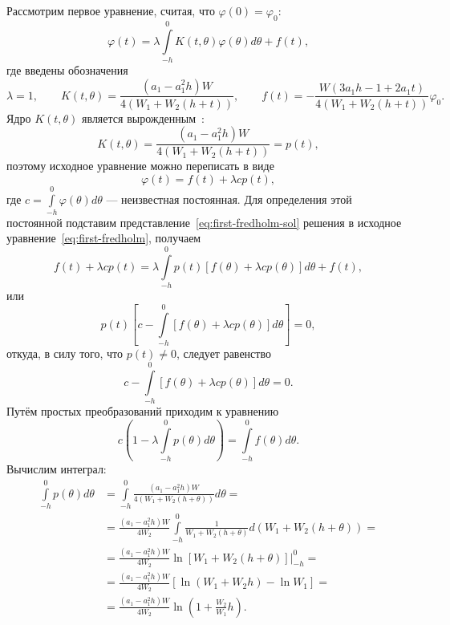 \documentclass[a4paper,14pt]{article}
\begin{document}
Рассмотрим первое уравнение, считая, что $\varphi(0) = \varphi_0$:
\begin{equation}
  \label{eq:first-fredholm}
  \varphi(t) = \lambda \int\limits_{-h}^{0} K(t, \theta) \varphi(\theta) d\theta + f(t),
\end{equation}
где введены обозначения
\begin{equation*}
  \lambda = 1,
  \qquad
  K(t, \theta) = \frac{(a_1 - a_1^2 h) W}{4 (W_1 + W_2 (h + t))},
  \qquad
  f(t)
  = -\frac{W (3 a_1 h - 1 + 2 a_1 t)}{4 (W_1 + W_2 (h + t))} \varphi_0.
\end{equation*}
Ядро $K(t, \theta)$ является вырожденным~\cite[стр.~189]{bicadze1982}:
\begin{equation*}
  K(t, \theta) = \frac{(a_1 - a_1^2 h) W}{4 (W_1 + W_2 (h + t))} = p(t),
\end{equation*}
поэтому исходное уравнение можно переписать в виде
\begin{equation}
  \label{eq:first-fredholm-sol}
  \varphi(t) = f(t) + \lambda c p(t),
\end{equation}
где ${\displaystyle c = \int\limits_{-h}^{0} \varphi(\theta) d\theta}$ ---
неизвестная постоянная. Для определения этой постоянной подставим
представление~\eqref{eq:first-fredholm-sol} решения в исходное
уравнение~\eqref{eq:first-fredholm}, получаем
\begin{equation*}
  f(t) + \lambda c p(t)
  =
  \lambda \int\limits_{-h}^{0}
  p(t) \left[ f(\theta) + \lambda c p(\theta) \right] d\theta
  + f(t),
\end{equation*}
или
\begin{equation*}
  p(t) \left[
    c -
    \int\limits_{-h}^{0}
    \left[ f(\theta) + \lambda c p(\theta) \right] d\theta
  \right]
  = 0,
\end{equation*}
откуда, в силу того, что $p(t) \neq 0$, следует равенство
\begin{equation*}
  c -
  \int\limits_{-h}^{0}
  \left[ f(\theta) + \lambda c p(\theta) \right] d\theta
  = 0.
\end{equation*}
Путём простых преобразований приходим к уравнению
\begin{equation*}
  c \left(
  1 - \lambda \int\limits_{-h}^{0} p(\theta) d\theta
  \right)
  =
  \int\limits_{-h}^{0} f(\theta) d\theta.
\end{equation*}
Вычислим интеграл:
\begin{equation*}
  \begin{aligned}
    \int\limits_{-h}^{0} p(\theta) d\theta
    &=
      \int\limits_{-h}^{0} \frac{(a_1 - a_1^2 h) W}{4 (W_1 + W_2 (h + \theta))} d\theta = \\
    &=
      \frac{(a_1 - a_1^2 h) W}{4 W_2}
      \int\limits_{-h}^{0} \frac{1}{W_1 + W_2 (h + \theta)} d(W_1 + W_2 (h + \theta)) = \\
    &=
      \frac{(a_1 - a_1^2 h) W}{4 W_2}
      \ln \left[W_1 + W_2 (h + \theta)\right] \Big|_{-h}^{0} = \\
    &=
      \frac{(a_1 - a_1^2 h) W}{4 W_2}
      \left[ \ln (W_1 + W_2 h) - \ln W_1 \right] = \\
    &=
      \frac{(a_1 - a_1^2 h) W}{4 W_2}
      \ln \left( 1 + \frac{W_2}{W_1} h \right).
  \end{aligned}
\end{equation*}
\end{document}
